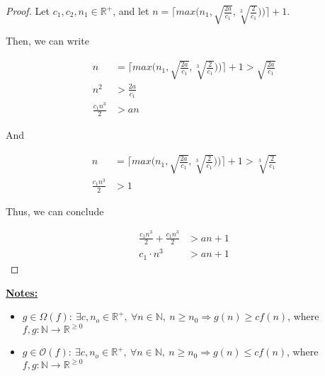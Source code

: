\documentclass[12pt]{article}
\begin{document}
\begin{enumerate}[1.]
\begin{proof}
        \bigskip

        Let $c_1, c_2, n_1 \in \mathbb{R}^+$, and let $n = \bigl\lceil max\bigl( n_1, \sqrt{\frac{2a}{c_1}}, \sqrt[3]{\frac{2}{c_1}}) \bigr) \bigr\rceil + 1$.

        \bigskip

        Then, we can write

        \begin{align}
            n &= \bigl\lceil max\bigl( n_1, \sqrt{\frac{2a}{c_1}}, \sqrt[3]{\frac{2}{c_1}}) \bigr) \bigr\rceil + 1 > \sqrt{\frac{2a}{c_1}}\\
            n^2 &> \frac{2a}{c_1}\\
            \frac{c_1 n^3}{2} &> an
        \end{align}

        \bigskip

        And

        \begin{align}
            n &= \bigl\lceil max\bigl( n_1, \sqrt{\frac{2a}{c_1}}, \sqrt[3]{\frac{2}{c_1}}) \bigr) \bigr\rceil + 1 > \sqrt[3]{\frac{2}{c_1}}\\
            \frac{c_1n^3}{2} &> 1
        \end{align}

        \bigskip

        Thus, we can conclude

        \begin{align}
            \frac{c_1n^3}{2} + \frac{c_1n^3}{2} &> an + 1\\
            c_1 \cdot n^3 &> an + 1
        \end{align}
    \end{proof}

    \bigskip

    \underline{\textbf{Notes:}}

    \bigskip

    \begin{itemize}
        \item
        $g \in \Omega(f):\:\exists c,n_o \in \mathbb{R}^{+},\:\forall n \in
        \mathbb{N},\:n \geq n_0 \Rightarrow g(n) \geq cf(n)$, where $f,g:\mathbb{N} \to \mathbb{R}^{\geq 0}$

        \item

        $g \in \mathcal{O}(f):\:\exists c,n_o \in \mathbb{R}^{+},\:\forall n \in
        \mathbb{N},\:n \geq n_0 \Rightarrow g(n) \leq cf(n)$, where $f,g:\mathbb{N} \to \mathbb{R}^{\geq 0}$


\end{itemize}
\end{enumerate}
\end{document}

